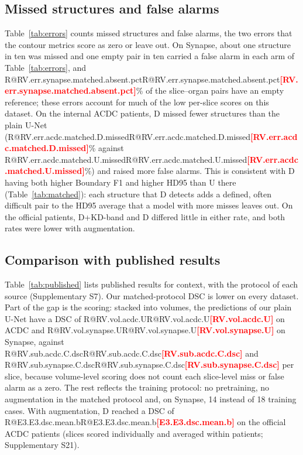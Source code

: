 \documentclass[fleqn,10pt,lineno]{wlpeerj}
\makeatletter
\newcommand{\R}[1]{\ifcsname R@#1\endcsname\csname R@#1\endcsname\else\textbf{\textcolor{red}{[#1]}}\fi}
\makeatother
\begin{document}
\subsection*{Missed structures and false alarms}
Table~\ref{tab:errors} counts missed structures and false alarms, the two errors that the contour metrics score as zero or leave out. On Synapse, about one structure in ten was missed and one empty pair in ten carried a false alarm in each arm of Table~\ref{tab:errors}, and \R{RV.err.synapse.matched.absent.pct}\% of the slice--organ pairs have an empty reference; these errors account for much of the low per-slice scores on this dataset. On the internal ACDC patients, D missed fewer structures than the plain U-Net (\R{RV.err.acdc.matched.D.missed}\% against \R{RV.err.acdc.matched.U.missed}\%) and raised more false alarms. This is consistent with D having both higher Boundary F1 and higher HD95 than U there (Table~\ref{tab:matched}): each structure that D detects adds a defined, often difficult pair to the HD95 average that a model with more misses leaves out. On the official patients, D+KD-band and D differed little in either rate, and both rates were lower with augmentation.

\begin{table}[!tb]
\centering
{\small}
\caption{\label{tab:errors}Missed structures and false alarms, mean $\pm$ SD over runs (post hoc, descriptive). Missed structures: share of image-- or slice--class pairs with a non-empty reference whose prediction is empty. False alarms: share of pairs with an empty reference whose prediction is not empty (ISIC2018 has no such pair). Pair counts, other arms and rates by structure size: Supplementary S8, S24.}
\end{table}

\subsection*{Comparison with published results}
Table~\ref{tab:published} lists published results for context, with the protocol of each source (Supplementary S7). Our matched-protocol DSC is lower on every dataset. Part of the gap is the scoring: stacked into volumes, the predictions of our plain U-Net have a DSC of \R{RV.vol.acdc.U} on ACDC and \R{RV.vol.synapse.U} on Synapse, against \R{RV.sub.acdc.C.dsc} and \R{RV.sub.synapse.C.dsc} per slice, because volume-level scoring does not count each slice-level miss or false alarm as a zero. The rest reflects the training protocol: no pretraining, no augmentation in the matched protocol and, on Synapse, 14 instead of 18 training cases. With augmentation, D reached a DSC of \R{E3.E3.dsc.mean.b} on the official ACDC patients (slices scored individually and averaged within patients; Supplementary S21).
\end{document}

